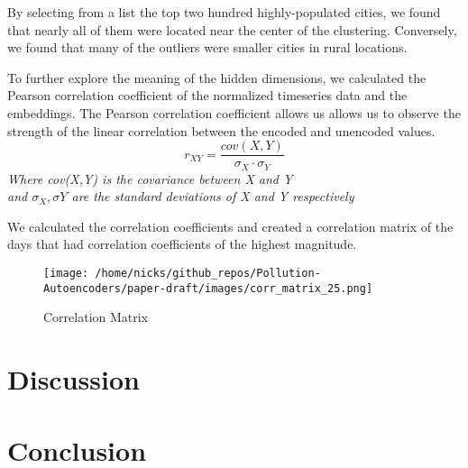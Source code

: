 \documentclass{article}
\begin{document}
By selecting from a list the top two hundred highly-populated cities, we found that nearly
all of them were located near the center of the clustering. Conversely, we found that many 
of the outliers were smaller cities in rural locations. \par

\newpage

To further explore the meaning of the hidden dimensions, we calculated the Pearson correlation
coefficient of the normalized timeseries data and the embeddings. The Pearson correlation
coefficient allows us allows us to observe the strength of the linear correlation between
the encoded and unencoded values. 
\begin{equation*}
    r_{XY}=\frac{cov(X,Y)}{\sigma_{X} \cdot \sigma_{Y}}
\end{equation*}
\textit{Where cov(X,Y) is the covariance between X and Y \\
and $\sigma_{X},\sigma{Y}$ are the standard deviations of X and Y respectively}

\vspace{0.1in}

We calculated the correlation coefficients and created a correlation matrix of the days that had
correlation coefficients of the highest magnitude.\par

\begin{figure}[h]
\texttt{[image: /home/nicks/github\_repos/Pollution-Autoencoders/paper-draft/images/corr\_matrix\_25.png]}
\caption{Correlation Matrix}
\label{fig:matrix}
\end{figure}
\section{Discussion}

\section{Conclusion}

\printbibliography
\end{document}
